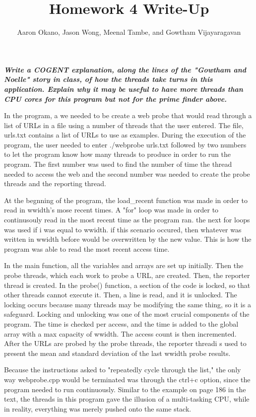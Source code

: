 \documentclass[12pt,letterpaper]{article}
\title{Homework 4 Write-Up}
\author{Aaron Okano, Jason Wong, Meenal Tambe, and Gowtham Vijayaragavan}
\begin{document}
\maketitle
\setcounter{page}{1}
\textit{\textbf{Write a COGENT explanation, along the lines of the "Gowtham and Noelle" story in class, of how the threads take turns in this application. Explain why it may be useful to have more threads than CPU cores for this program but not for the prime finder above.}}
\newline

\linespread{1.5}
In the program, a we needed to be create a web probe that would read through a list of URLs in a file using a number of threads that the user entered. The file, urls.txt contains a list of URLs to use as examples. During the execution of the program, the user needed to enter ./webprobe urls.txt followed by two numbers to let the program know how many threads to produce in order to run the program. The first number was used to find the number of time the thread needed to access the web and the second number was needed to create the probe threads and the reporting thread. 

At the begnning of the program, the load\_recent function was made in order to read in wwidth's mose recent times. A "for" loop was made in order to continusouly read in the most recent time as the program ran. the next for loops was used if i was equal to wwidth. if this scenario occured, then whatever was written in wwidth before would be overwritten by the new value. This is how the program was able to read the most recent access time. 

In the main function, all the variables and arrays are set up initially. Then the probe threads, which each work to probe a URL, are created. Then, the reporter thread is created. In the probe() function, a section of the code is locked, so that other threads cannot execute it. Then, a line is read, and it is unlocked. The locking occurs because many threads may be modifying the same thing, so it is a safeguard. Locking and unlocking was one of the most crucial components of the program. The time is checked per access, and the time is added to the global array with a max capacity of wwidth.  The access count is then incremented. After the URLs are probed by the probe threads, the reporter threadi s used to present the mean and standard deviation of the last wwidth probe results.

Because the instructions asked to "repeatedly cycle through the list," the only way webprobe.cpp would be terminated was through the ctrl+c option, since the program needed to run continuously. Similar to the example on page 186 in the text, the threads in this program gave the illusion of a multi-tasking CPU, while in reality, everything was merely pushed onto the same stack. 
\end{document}
